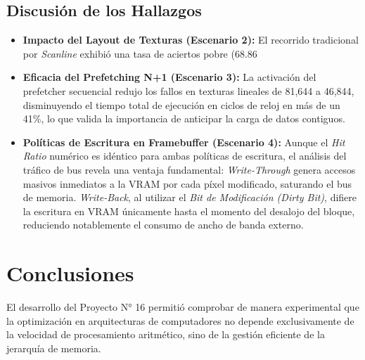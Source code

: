 \documentclass[12pt,letterpaper]{article}
\begin{document}
\subsection{\color{UCSky}Discusión de los Hallazgos}
\begin{itemize}
    \item \textbf{Impacto del Layout de Texturas (Escenario 2):} El recorrido tradicional por \textit{Scanline} exhibió una tasa de aciertos pobre (68.86%
    \item \textbf{Eficacia del Prefetching N+1 (Escenario 3):} La activación del prefetcher secuencial redujo los fallos en texturas lineales de 81,644 a 46,844, disminuyendo el tiempo total de ejecución en ciclos de reloj en más de un 41\%, lo que valida la importancia de anticipar la carga de datos contiguos.
    \item \textbf{Políticas de Escritura en Framebuffer (Escenario 4):} Aunque el \textit{Hit Ratio} numérico es idéntico para ambas políticas de escritura, el análisis del tráfico de bus revela una ventaja fundamental: \textit{Write-Through} genera accesos masivos inmediatos a la VRAM por cada píxel modificado, saturando el bus de memoria. \textit{Write-Back}, al utilizar el \textit{Bit de Modificación (Dirty Bit)}, difiere la escritura en VRAM únicamente hasta el momento del desalojo del bloque, reduciendo notablemente el consumo de ancho de banda externo.
\end{itemize}

\section{\color{UCBlue}Conclusiones}

El desarrollo del Proyecto N° 16 permitió comprobar de manera experimental que la optimización en arquitecturas de computadores no depende exclusivamente de la velocidad de procesamiento aritmético, sino de la gestión eficiente de la jerarquía de memoria. 
\end{document}
